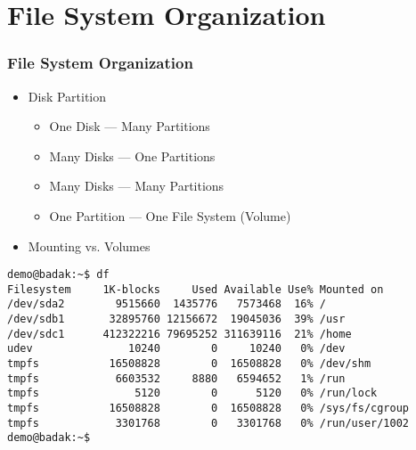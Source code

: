 \documentclass[aspectratio=169, xcolor=table, notheorems, hyperref={pdfpagelabels=false}]{beamer}
\begin{document}
\section{File System Organization}
\begin{frame}[fragile]
\frametitle{File System Organization}
\begin{itemize}
\item Disk Partition
\begin{itemize}
\item One Disk --- Many Partitions
\item Many Disks --- One Partitions
\item Many Disks --- Many Partitions
\item One Partition --- One File System (Volume)
\end{itemize}
\item Mounting vs. Volumes
\end{itemize}
\begin{lstlisting}[basicstyle=\ttfamily\footnotesize]
demo@badak:~$ df
Filesystem     1K-blocks     Used Available Use% Mounted on
/dev/sda2        9515660  1435776   7573468  16% /
/dev/sdb1       32895760 12156672  19045036  39% /usr
/dev/sdc1      412322216 79695252 311639116  21% /home
udev               10240        0     10240   0% /dev
tmpfs           16508828        0  16508828   0% /dev/shm
tmpfs            6603532     8880   6594652   1% /run
tmpfs               5120        0      5120   0% /run/lock
tmpfs           16508828        0  16508828   0% /sys/fs/cgroup
tmpfs            3301768        0   3301768   0% /run/user/1002
demo@badak:~$ 
\end{lstlisting}
\end{frame}

\end{document}
